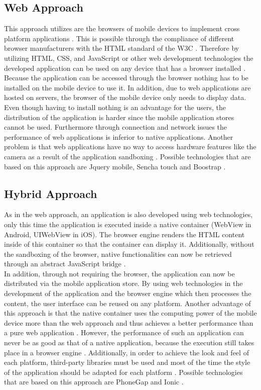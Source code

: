 \documentclass[Bachelor,BIF,english]{twbook}
\begin{document}
\subsection{Web Approach}
This approach utilizes are the browsers of mobile devices to implement cross platform applications \cite[p.~2]{7934674}. This is possible through the compliance of different browser manufacturers with the HTML standard of the W3C \cite[p.~2]{LinckArne2016}. Therefore by utilizing HTML, CSS, and JavaScript or other web development technologies the developed application can be used on any device that has a browser installed \cite[p.~2]{7934674}.
\\[\baselineskip]
Because the application can be accessed through the browser nothing has to be installed on the mobile device to use it. In addition, due to web applications are hosted on servers, the browser of the mobile device only needs to display data. Even though having to install nothing is an advantage for the users, the distribution of the application is harder since the mobile application stores cannot be used. Furthermore through connection and network issues the performance of web applications is inferior to native applications. Another problem is that web applications have no way to access hardware features like the camera as a result of the application sandboxing \cite[p.~626]{6420693}. Possible technologies that are based on this approach are Jquery mobile, Sencha touch and Boostrap \cite[p.~2]{7934674}.

\subsection{Hybrid Approach}
As in the web approach, an application is also developed using web technologies, only this time the application is executed inside a native container (WebView in Android, UIWebView in iOS). The browser engine renders the HTML content inside of this container so that the container can display it. Additionally, without the sandboxing of the browser, native functionalities can now be retrieved through an abstract JavaScript bridge \cite[p.~626]{6420693} \cite[p.~2]{7479278}. 
\\[\baselineskip]
In addition, through not requiring the browser, the application can now be distributed via the mobile application store. By using web technologies in the development of the application and the browser engine which then processes the content, the user interface can be reused on any platform. Another advantage of this approach is that the native container uses the computing power of the mobile device more than the web approach and thus achieves a better performance than a pure web application \cite[p.~626]{6420693}. However, the performance of such an application can never be as good as that of a native application, because the execution still takes place in a browser engine \cite[p.~2]{7479278}. Additionally, in order to achieve the look and feel of each platform, third-party libraries must be used and most of the time the style of the application should be adapted for each platform \cite[p.~627]{6420693}. Possible technologies that are based on this approach are PhoneGap and Ionic \cite[p.~2]{7934674}.
\end{document}
